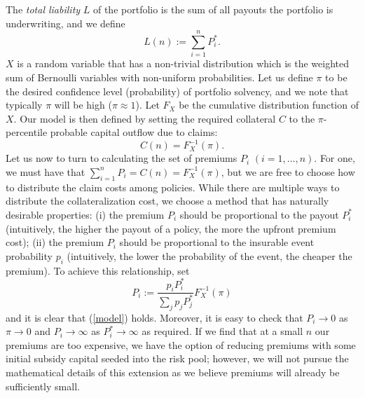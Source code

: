 \documentclass[12pt]{article}
\begin{document}
The \textit{total liability} $L$ of the portfolio is the sum of all payouts the portfolio is underwriting, and we define 
   $$L(n) := \sum_{i=1}^n P^*_i.$$
$X$ is a random variable that has a non-trivial distribution which is the weighted sum of Bernoulli variables with non-uniform probabilities. Let us define $\pi$ to be the desired confidence level (probability) of portfolio solvency, and we note that typically $\pi$ will be high ($\pi\approx 1$). Let $F_X$ be the cumulative distribution function of $X$. Our model is then defined by setting the required collateral $C$ to the $\pi$-percentile probable capital outflow due to claims:
\begin{equation}
    \label{model}
    C(n) = F_X^{-1}(\pi).
\end{equation}
Let us now to turn to calculating the set of premiums $P_i$ $(i=1,\ldots,n)$. For one, we must have that $\sum_{i=1}^n P_i = C(n) = F_X^{-1}(\pi)$, but we are free to choose how to distribute the claim costs among policies. While there are multiple ways to distribute the collateralization cost, we choose a method that has naturally desirable properties: (i) the premium $P_i$ should be proportional to the payout $P_i^*$ (intuitively, the higher the payout of a policy, the more the upfront premium cost); (ii) the premium $P_i$ should be proportional to the insurable event probability $p_i$ (intuitively, the lower the probability of the event, the cheaper the premium). To achieve this relationship, set
     $$P_i := \frac{p_iP_i^*}{\sum_j p_jP_j^*} F_X^{-1}(\pi)$$
and it is clear that (\ref{model}) holds. Moreover, it is easy to check that $P_i \to 0$ as $\pi \to 0$ and $P_i\to\infty$ as $P_i^*\to\infty$ as required. If we find that at a small $n$ our premiums are too expensive, we have the option of reducing premiums with some initial subsidy capital seeded into the risk pool; however, we will not pursue the mathematical details of this extension as we believe premiums will already be sufficiently small.
\end{document}
